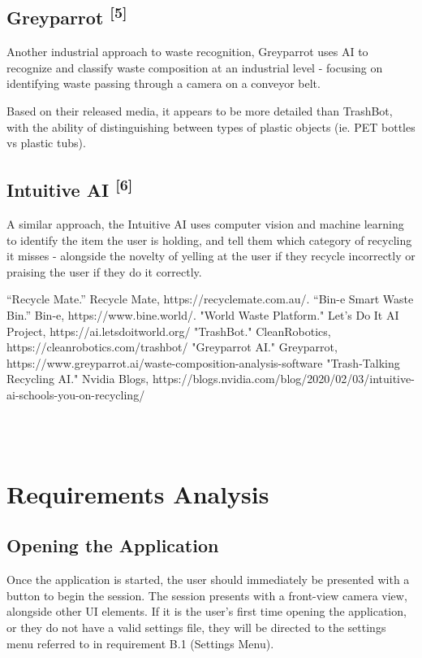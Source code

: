 \documentclass[conference]{IEEEtran}
\begin{document}
\subsection{Greyparrot \textsuperscript{[5]}}

Another industrial approach to waste recognition, Greyparrot uses AI to recognize and classify waste composition at an industrial level - focusing on identifying waste passing through a camera on a conveyor belt.

Based on their released media, it appears to be more detailed than TrashBot, with the ability of distinguishing between types of plastic objects (ie. PET bottles vs plastic tubs).
\newline

\subsection{Intuitive AI \textsuperscript{[6]}}

A similar approach, the Intuitive AI uses computer vision and machine learning to identify the item the user is holding, and tell them which category of recycling it misses - alongside the novelty of yelling at the user if they recycle incorrectly or praising the user if they do it correctly.
\newline

\begin{thebibliography}{00}
 “Recycle Mate.” Recycle Mate, https://recyclemate.com.au/. 
 “Bin-e Smart Waste Bin.” Bin-e, https://www.bine.world/. 
 "World Waste Platform." Let's Do It AI Project, https://ai.letsdoitworld.org/
 "TrashBot." CleanRobotics, https://cleanrobotics.com/trashbot/
 "Greyparrot AI." Greyparrot, https://www.greyparrot.ai/waste-composition-analysis-software
 "Trash-Talking Recycling AI." Nvidia Blogs, https://blogs.nvidia.com/blog/2020/02/03/intuitive-ai-schools-you-on-recycling/
\end{thebibliography}~\\~\\

\section{Requirements Analysis}

\subsection{Opening the Application}
Once the application is started, the user should immediately be presented with a button to begin the session. The session presents with a front-view camera view, alongside other UI elements. If it is the user's first time opening the application, or they do not have a valid settings file, they will be directed to the settings menu referred to in requirement B.1 (Settings Menu).
\newline
\end{document}

